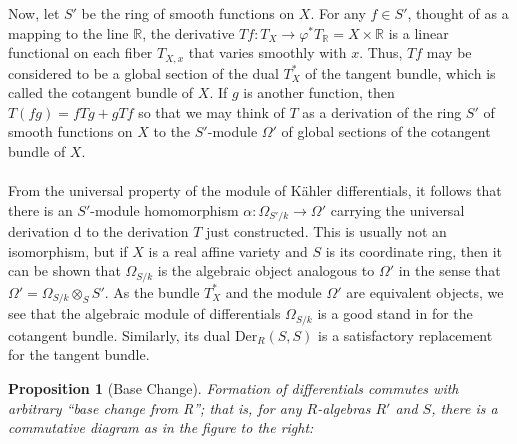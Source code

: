 \documentclass{beamer}
\newtheorem{prop}{Proposition}
\begin{document}
\begin{frame}
\begin{small}

Now, let $S'$ be the ring of smooth functions on $X$. For any $f\in S'$, thought of as a mapping to the line $\mathbb{R}$, the derivative $Tf:T_X\to \varphi^{*}T_\mathbb{R} = X\times\mathbb{R}$ is a linear functional on each fiber $T_{X,x}$ that varies smoothly with $x$. Thus, $Tf$ may be considered to be a global section of the dual $T^{*}_X$ of the tangent bundle, which is called the cotangent bundle of $X$. If $g$ is another function, then $T(fg) = fTg + gTf$ so that we may think of $T$ as a derivation of the ring $S'$ of smooth functions on $X$ to the $S'$-module $\Omega'$ of global sections of the cotangent bundle of $X$. 
\\\indent
\\From the universal property of the module of K{\"a}hler differentials, it follows that there is an $S'$-module homomorphism $\alpha:\Omega_{S'/k}\to \Omega'$ carrying the universal derivation d to the derivation $T$ just constructed. This is usually not an isomorphism, but if $X$ is a real affine variety and $S$ is its coordinate ring, then it can be shown that $\Omega_{S/k}$ is the algebraic object analogous to $\Omega'$ in the sense that $\Omega' = \Omega_{S/k}\otimes_S S'$. As the bundle $T^{*}_X$ and the module $\Omega'$ are equivalent objects, we see that the algebraic module of differentials $\Omega_{S/k}$ is a good stand in for the cotangent bundle. Similarly, its dual Der$_R(S,S)$ is a satisfactory replacement for the tangent bundle. 



\end{small}
\end{frame}




\begin{frame}
\begin{small}
\begin{prop}[Base Change]
Formation of differentials commutes with arbitrary ``base change from R''; that is, for any $R$-algebras $R'$ and $S$, there is a commutative diagram as in the figure to the right: 
\end{prop}


\end{small}
\end{frame}
\end{document}
